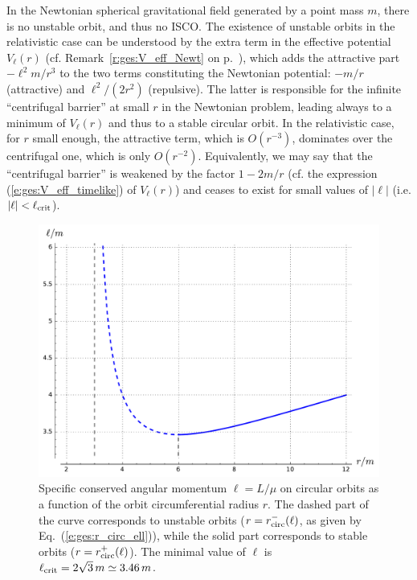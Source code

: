 \begin{remark}
In the Newtonian spherical gravitational field generated by a point mass $m$,
there is no unstable orbit, and thus no ISCO. The existence of unstable orbits
in the relativistic case can be understood by the extra term in
the effective potential $V_{\ell}(r)$ (cf. Remark~\ref{r:ges:V_eff_Newt} on p.~\pageref{r:ges:V_eff_Newt}), which
adds the attractive part $-\ell^2 m/r^3$ to the two
terms constituting the Newtonian potential: $-m/r$ (attractive) and
$\ell^2/(2 r^2)$ (repulsive). The latter is responsible for the infinite ``centrifugal
barrier'' at small $r$ in the Newtonian problem, leading
always to a minimum of $V_\ell(r)$ and thus to a stable circular orbit.
In the relativistic case, for $r$ small enough, the attractive term, which is $O(r^{-3})$, dominates over
the centrifugal one, which is only $O(r^{-2})$.
Equivalently, we may say that the ``centrifugal barrier'' is weakened by the
factor $1-2m/r$ (cf. the expression (\ref{e:ges:V_eff_timelike}) of $V_\ell(r)$)
and ceases to exist for small values of $|\ell|$ (i.e.
$|\ell|<\ell_{\rm crit}$).
\end{remark}

\begin{figure}
\centerline{\includegraphics[height=0.4\textheight]{ges_ell_circ_orbit.pdf}}
\caption[]{\label{f:ges:ell_circ_orbit} \footnotesize
Specific conserved angular momentum $\ell = L/\mu$
on circular orbits as a function of the
orbit circumferential radius $r$. The dashed part of the curve
corresponds to unstable orbits ($r=r_{\rm circ}^-(\ell)$, as given by Eq.~(\ref{e:ges:r_circ_ell})), while
the solid part corresponds to stable orbits ($r=r_{\rm circ}^+(\ell)$).
The minimal value of $\ell$ is $\ell_{\rm crit} = 2\sqrt{3}\, m \simeq 3.46\, m$.}
\end{figure}

